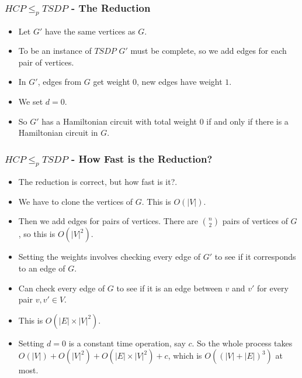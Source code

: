 \documentclass[handout]{beamer}
\begin{document}
\begin{frame}
\frametitle{$HCP\leq_p TSDP$ - The Reduction}
\begin{itemize}
\item Let $G'$ have the same vertices as $G$. 
\vspace{0.3cm}
\item To be an instance of $TSDP$ $G'$ must be complete, so we add edges for each pair of vertices.
\vspace{0.3cm}
\item In $G'$, edges from $G$ get weight 0, new edges have weight $1$. 
\vspace{0.3cm}
\item We set $d=0$. 
\vspace{0.3cm}
\item So $G'$ has a Hamiltonian circuit with total weight 0 if and only if there is a Hamiltonian circuit in $G$. 
\end{itemize} 
\end{frame}

\begin{frame}
\frametitle{$HCP\leq_p TSDP$ - How Fast is the Reduction?}
\begin{itemize}
\item The reduction is correct, but how fast is it?.
\vspace{0.3cm}
\item We have to clone the vertices of $G$. This is $O(|V|)$. 
\vspace{0.3cm}
\item Then we add edges for pairs of vertices. There are $n \choose 2$ pairs of vertices of $G$, so this is $O(|V|^2)$. 
\vspace{0.3cm}
\item Setting the weights involves checking every edge of $G'$ to see if it corresponds to an edge of $G$. 
\vspace{0.3cm}
\item Can check every edge of $G$ to see if it is an edge between $v$ and $v'$ for every pair $v,v'\in V$. 
\vspace{0.3cm}
\item This is $O(|E|\times|V|^2)$.
\vspace{0.3cm}
\item Setting $d=0$ is a constant time operation, say $c$. So the whole process takes $O(|V|)+O(|V|^2)+O(|E|\times|V|^2)+c$, which is $O((|V|+|E|)^3)$ at most.
\end{itemize} 
\end{frame}
\end{document}
